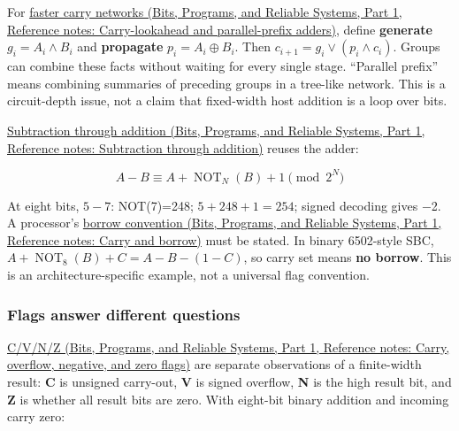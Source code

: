For \href{../01-Bits-Programs-and-Reliable-Systems-P01/main.pdf\#appendix-b5c46b2d94ff}{faster carry networks (Bits, Programs, and Reliable Systems, Part 1, Reference notes: Carry-lookahead and parallel-prefix adders)}, define \textbf{generate} \(g_i=A_i\land B_i\) and \textbf{propagate} \(p_i=A_i\oplus B_i\). Then \(c_{i+1}=g_i\lor(p_i\land c_i)\). Groups can combine these facts without waiting for every single stage. ``Parallel prefix'' means combining summaries of preceding groups in a tree-like network. This is a circuit-depth issue, not a claim that fixed-width host addition is a loop over bits.

\href{../01-Bits-Programs-and-Reliable-Systems-P01/main.pdf\#appendix-1c7df340573e}{Subtraction through addition (Bits, Programs, and Reliable Systems, Part 1, Reference notes: Subtraction through addition)} reuses the adder:

\[
A-B \equiv A+\operatorname{NOT}_N(B)+1\pmod{2^N}
\]

At eight bits, \(5-7\): NOT(7)=248; \(5+248+1=254\); signed decoding gives −2. A processor's \href{../01-Bits-Programs-and-Reliable-Systems-P01/main.pdf\#appendix-d52d5f78ffd1}{borrow convention (Bits, Programs, and Reliable Systems, Part 1, Reference notes: Carry and borrow)} must be stated. In binary 6502-style SBC, \(A+\operatorname{NOT}_8(B)+C=A-B-(1-C)\), so carry set means \textbf{no borrow}. This is an architecture-specific example, not a universal flag convention.

\subsubsection{Flags answer different questions}\label{05-engine-i-ch001-flags-answer-different-questions}

\hypertarget{05-engine-i-ch001-flags-answer-different-questions}{}

\href{../01-Bits-Programs-and-Reliable-Systems-P01/main.pdf\#appendix-8d687c9c08ab}{C/V/N/Z (Bits, Programs, and Reliable Systems, Part 1, Reference notes: Carry, overflow, negative, and zero flags)} are separate observations of a finite-width result: \textbf{C} is unsigned carry-out, \textbf{V} is signed overflow, \textbf{N} is the high result bit, and \textbf{Z} is whether all result bits are zero. With eight-bit binary addition and incoming carry zero:

